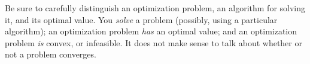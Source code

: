 \documentclass[12pt]{article}
\begin{document}
Be sure to carefully distinguish an optimization problem, 
an algorithm for solving it, and its optimal value.
You \emph{solve} a problem (possibly, using a particular algorithm);
an optimization problem \emph{has} an optimal value;
and an optimization problem \emph{is} convex, or infeasible.
It does not make sense to talk about whether or not a problem converges.



\label{s-content}
\end{document}
